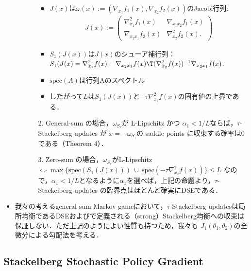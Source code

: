 \documentclass[a4paper,10pt,dvipdfmx]{jsarticle}
\begin{document}
\begin{itemize}
\begin{itemize}
\begin{itemize}
            \begin{itemize}
                \item $J(x)$は$\omega(x):=(\nabla_{x_1}f_1(x),\nabla_{x_2}f_2(x))$のJacobi行列:
                \begin{gather}
                    J(x):=
                    \begin{pmatrix}
                        \nabla_{x_1}^2 f_1(x) & \nabla_{x_1x_2} f_1(x) \\
                        \nabla_{x_2x_1} f_2(x) & \nabla_{x_2}^2 f_2(x).
                    \end{pmatrix}
                \end{gather}
                \item $S_1(J(x))$は$J(x)$のシューア補行列：$S_1(J(x)=\nabla_{x_1}^2f(x)-\nabla_{x_2x_1}f(x)\T(\nabla_{x_2}^2f(x))^{-1}\nabla_{x_2x_1}f(x)$.
                \item $\mathrm{spec}(A)$は行列Aのスペクトル
                \item したがって$L$は$S_1(J(x))$と$-\tau\nabla_{x_2}^2f(x)$の固有値の上界である．
            \end{itemize}
            
            \item[2.] General-sum の場合，$\omega_{S_{\tau}}$が L-Lipschitz かつ $\alpha_1<1/L$ならば，$\tau$-Stackelberg updates が $\dot{x}=-\omega_{S_{\tau}}$の saddle points に収束する確率は0である（Theorem 4）．
            \item[3.] Zero-sum の場合，$\omega_{S_{\tau}}$がL-Lipschitz $\iff \max\{\mathrm{spec}(S_1(J(x)))~\cup~\mathrm{spec}(-\tau\nabla_{x_2}^2f(x))\}\le L$ なので，$\alpha_1<1/L$となるように$\alpha_1$を選べば，上記の命題より，$\tau$-Stackelberg updates の臨界点はほとんど確実にDSEである．
        \end{itemize}
    \end{itemize}
    \item 我々の考えるgeneral-sum Markov gameにおいて，$\tau$-Stackelberg updatesは局所均衡であるDSEおよびで定義される（strong）Stackelberg均衡への収束は保証しない．ただ上記のようによい性質も持つため，我々も
    $J_1(\theta_1,\theta_2)$の全微分による勾配法を考える．
\end{itemize}

\subsection{Stackelberg Stochastic Policy Gradient}\label{sec:total_dev_PG}
\end{document}
